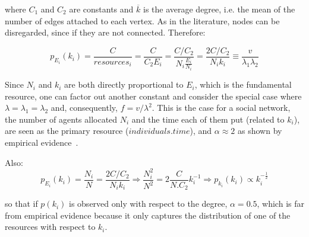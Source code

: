 \documentclass[a4paper, 11pt]{article} %
\begin{document}
\noindent where $C_1$ and $C_2$ are constants and $\overline{k}$ is
the average degree, i.e. the mean of the number of edges attached to each vertex.
As in the literature, nodes can be disregarded, since if they are not connected. Therefore:

\begin{equation}\label{eq:eqf}
	p_{E_i}(k_i)=\frac{C}{resources_i}=\frac{C}{C_2 E_i}=\frac{C/C_2}{N_i \frac{E_i}{N_i}}=\frac{2C/C_2}{N_i k_i} \equiv \frac{v}{\lambda_1   \lambda_2}
\end{equation}

Since $N_i$ and $k_i$ are both directly proportional to $E_i$, which is the fundamental resource, one can factor out another constant and consider the special case where $\lambda=\lambda_1=\lambda_2$ and, consequently, $f=v/\lambda^2$. This is the case for a social network, the number of agents allocated $N_i$ and the time each of them put (related to $k_i$), are seen as the primary resource ($individuals . time$), and $\alpha\approx 2$ as shown by empirical evidence~\cite{newman}.

Also:
\begin{equation}\label{eq:eqf}
	p_{E_i}(k_i)=\frac{N_i}{N}=\frac{2C/C_2}{N_i k_i} \Rightarrow \frac{N_i^2}{N^2}=2\frac{C}{N.C_2}k_i^{-1} \Rightarrow p_{k_i}(k_i)\propto k_i^{-\frac{1}{2}}
\end{equation}

\noindent so that if $p(k_i)$ is observed only with respect to the degree, 
$\alpha=0.5$,
which is far from empirical evidence because it only captures the distribution of one of the resources with respect to $k_i$.
\end{document}
